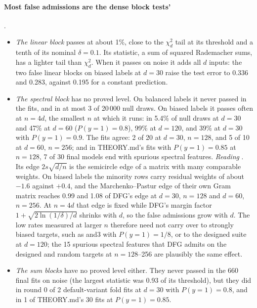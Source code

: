 \paragraph{Most false admissions are the dense block tests'} .
\begin{itemize}
\item \emph{The linear block} passes at about 1\%, close to the $\chi^2_d$ tail at its threshold and a tenth of its nominal $\delta=0.1$. Its statistic, a sum of squared Rademacher sums, has a lighter tail than $\chi^2_d$. When it passes on noise it adds all $d$ inputs: the two false linear blocks on biased labels at $d=30$ raise the test error to 0.336 and 0.283, against 0.195 for a constant prediction.
\item \emph{The spectral block} has no proved level. On balanced labels it never passed in the fits, and in at most 3 of 20\,000 null draws. On biased labels it passes often at $n=4d$, the smallest $n$ at which it runs: in 5.4\% of null draws at $d=30$ and 47\% at $d=60$ ($P(y{=}1)=0.8$), 99\% at $d=120$, and 39\% at $d=30$ with $P(y{=}1)=0.9$. The fits agree: 2 of 20 at $d=30$, $n=128$, and 5 of 10 at $d=60$, $n=256$; and in THEORY.md's fits with $P(y{=}1)=0.85$ at $n=128$, 7 of 30 final models end with spurious spectral features. \emph{Reading} . Its edge $2s\sqrt{d/n}$ is the semicircle edge of a matrix with many comparable weights. On biased labels the minority rows carry residual weights of about $-1.6$ against $+0.4$, and the Marchenko--Pastur edge of their own Gram matrix reaches 0.99 and 1.08 of DFG's edge at $d=30$, $n=128$ and $d=60$, $n=256$. At $n=4d$ that edge is fixed while DFG's margin factor $1+\sqrt{2\ln(1/\delta)/d}$ shrinks with $d$, so the false admissions grow with $d$. The low rates measured at larger $n$ therefore need not carry over to strongly biased targets, such as and3 with $P(y{=}1)=1/8$, or to the designed suite at $d=120$; the 15 spurious spectral features that DFG admits on the designed and random targets at $n=128$--256 are plausibly the same effect.
\item \emph{The sum blocks} have no proved level either. They never passed in the 660 final fits on noise (the largest statistic was 0.93 of its threshold), but they did in round 0 of 2 default-variant fold fits at $d=30$ with $P(y{=}1)=0.8$, and in 1 of THEORY.md's 30 fits at $P(y{=}1)=0.85$.
\end{itemize}

